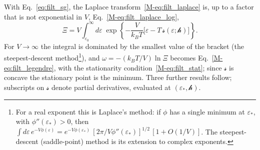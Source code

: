 \documentclass[10pt,a4paper]{article}
\theoremstyle{plain}
\theoremstyle{remark}
\newcommand{\hfield}{\mathscr{h}}  %
\newcommand{\lds}{\mathscr{s}}  %
\begin{document}
With Eq.~\eqref{eq:filt_sg}, the Laplace transform~\eqref{M-eq:filt_laplace}
is, up to a factor that is not exponential in $V$,
Eq.~\eqref{M-eq:filt_laplace_log},
\[
  \Xi = V\int_{\varepsilon_0}^{\infty}d\varepsilon\;
  \exp\left\{-\frac{V}{k_BT}\big[\varepsilon - T\,\lds(\varepsilon;\hfield)\big]\right\} .
\]
For $ V \to \infty $ the integral is dominated by the smallest value of the
bracket (the steepest-descent method\footnote{For a real exponent this is
Laplace's method: if $\phi$ has a single minimum at $\varepsilon_*$, with
$\phi''(\varepsilon_*)>0$, then
$\int d\varepsilon\,e^{-V\phi(\varepsilon)}
=e^{-V\phi(\varepsilon_*)}\,[2\pi/V\phi''(\varepsilon_*)]^{1/2}\,[1+O(1/V)]$.
The steepest-descent (saddle-point) method is its extension to complex
exponents.}), and $ \omega = -(k_BT/V)\ln\Xi $ becomes
Eq.~\eqref{M-eq:filt_legendre}, with the stationarity
condition~\eqref{M-eq:filt_stat}; since $\lds$ is concave the stationary point is
the minimum. Three further results follow; subscripts on $ \lds $ denote partial
derivatives, evaluated at $ (\varepsilon_*,\hfield) $.
\end{document}
